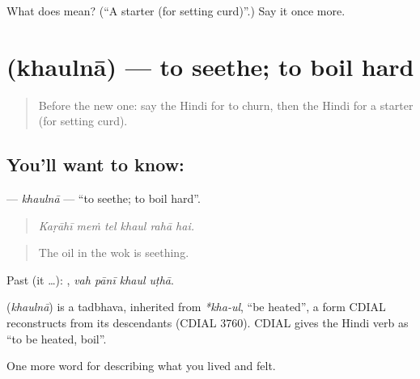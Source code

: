 \begin{tcolorbox}[breakable,colback=teal!4,colframe=teal!35!black,title={Before you move on}]
What does  mean? (\textquotedblleft{}A starter (for setting curd)\textquotedblright{}.) Say it once more.
\end{tcolorbox}
\section[\texorpdfstring{\hi{खौलना} (khaulnā)}{खौलना (khaulnā)}]{ (khaulnā) — to seethe; to boil hard}

\label{lesson:HI-C522-khaulna}



\begin{quote}
Before the new one: say the Hindi for to churn, then the Hindi for a starter (for setting curd).
\end{quote}

\subsection*{You'll want to know: }
\textbf{} — \emph{khaulnā} — \textquotedblleft{}to seethe; to boil hard\textquotedblright{}.

\begin{quote}
     
\end{quote}

\begin{quote}
\emph{Kaṛāhī meṁ tel khaul rahā hai.}
\end{quote}

\begin{quote}
The oil in the wok is seething.
\end{quote}

Past (it …):    , \emph{vah pānī khaul uṭhā}.

\begin{cousinweb}
\textbf{} (\emph{khaulnā}) is a tadbhava, inherited from \emph{*kha-ul}, \textquotedblleft{}be heated\textquotedblright{}, a form CDIAL reconstructs from its descendants (CDIAL 3760). CDIAL gives the Hindi verb as \textquotedblleft{}to be heated, boil\textquotedblright{}.
\end{cousinweb}

\begin{grammarlens}[title={What you've built}]
One more word for describing what you lived and felt.
\end{grammarlens}

